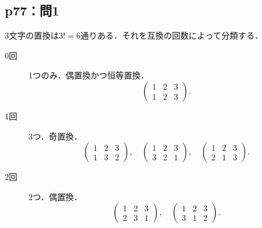 \documentclass[uplatex,dvipdfmx,a4paper,11pt,fleqn]{jsarticle}
\begin{document}
\subsection*{p77：問1}


\begin{tleftbar}
    3文字の置換は$3!=6$通りある．それを互換の回数によって分類する．
    \begin{description}
        \item[0回] 1つのみ．偶置換かつ恒等置換．
        \[
            \begin{pmatrix} 1 & 2 & 3 \\ 1 & 2 & 3 \end{pmatrix}.
        \]
        \item [1回] 3つ．奇置換．
        \[
            \begin{pmatrix} 1 & 2 & 3\\ 1 & 3 & 2 \end{pmatrix},\quad 
            \begin{pmatrix} 1 & 2 & 3\\ 3 & 2 & 1 \end{pmatrix},\quad 
            \begin{pmatrix} 1 & 2 & 3\\ 2 & 1 & 3 \end{pmatrix}.
        \]
        \item [2回] 2つ．偶置換．
        \[
            \begin{pmatrix} 1 & 2 & 3\\ 2 & 3 & 1 \end{pmatrix},\quad 
            \begin{pmatrix} 1 & 2 & 3\\ 3 & 1 & 2 \end{pmatrix}.
        \]
    \end{description}
\end{tleftbar}

\end{document}
